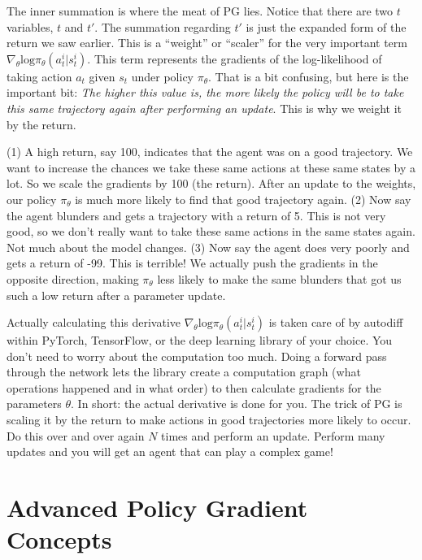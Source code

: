 \begin{flushleft}
    The inner summation is where the meat of PG lies. Notice that there are two $t$ variables, $t$ and $t'$. The summation regarding $t'$ is just the expanded form of the return we saw earlier. This is a ``weight'' or ``scaler'' for the very important term $\nabla_\theta \mathrm{log}\pi_\theta(a_t^i|s_t^i)$. This term represents the gradients of the log-likelihood of taking action $a_t$ given $s_t$ under policy $\pi_\theta$. That is a bit confusing, but here is the important bit: \textit{The higher this value is, the more likely the policy will be to take this same trajectory again after performing an update}. This is why we weight it by the return. \break
    
    (1) A high return, say 100, indicates that the agent was on a good trajectory. We want to increase the chances we take these same actions at these same states by a lot. So we scale the gradients by 100 (the return). After an update to the weights, our policy $\pi_\theta$ is much more likely to find that good trajectory again. (2) Now say the agent blunders and gets a trajectory with a return of 5. This is not very good, so we don't really want to take these same actions in the same states again. Not much about the model changes. (3) Now say the agent does very poorly and gets a return of -99. This is terrible! We actually push the gradients in the opposite direction, making $\pi_\theta$ less likely to make the same blunders that got us such a low return after a parameter update. \break

    Actually calculating this derivative $\nabla_\theta \mathrm{log}\pi_\theta(a_t^i|s_t^i)$ is taken care of by autodiff within PyTorch, TensorFlow, or the deep learning library of your choice. You don't need to worry about the computation too much. Doing a forward pass through the network lets the library create a computation graph (what operations happened and in what order) to then calculate gradients for the parameters $\theta$. In short: the actual derivative is done for you. The trick of PG is scaling it by the return to make actions in good trajectories more likely to occur. Do this over and over again $N$ times and perform an update. Perform many updates and you will get an agent that can play a complex game!
\end{flushleft}
\section{Advanced Policy Gradient Concepts}
